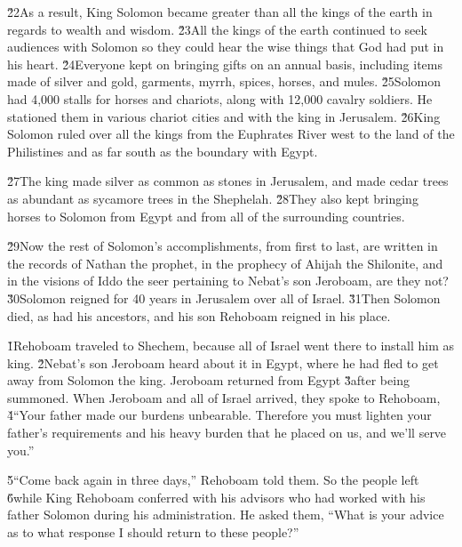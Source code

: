 \v{22}As a result, King Solomon became greater than all the kings of the earth in regards to wealth and wisdom. \v{23}All the kings of the earth continued to seek audiences with Solomon so they could hear the wise things that God had put in his heart. \v{24}Everyone kept on bringing gifts on an annual basis, including items made of silver and gold, garments, myrrh, spices, horses, and mules. \v{25}Solomon had 4,000 stalls for horses and chariots, along with 12,000 cavalry soldiers. He stationed them in various chariot cities and with the king in Jerusalem. \v{26}King Solomon ruled over all the kings from the Euphrates River west to the land of the Philistines and as far south as the boundary with Egypt.

\v{27}The king made silver as common as stones in Jerusalem, and made cedar trees as abundant as sycamore trees in the Shephelah. \v{28}They also kept bringing horses to Solomon from Egypt and from all of the surrounding countries.

\v{29}Now the rest of Solomon's accomplishments, from first to last, are written in the records of Nathan the prophet, in the prophecy of Ahijah the Shilonite, and in the visions of Iddo the seer pertaining to Nebat's son Jeroboam, are they not? \v{30}Solomon reigned for 40 years in Jerusalem over all of Israel. \v{31}Then Solomon died, as had his ancestors, and his son Rehoboam reigned in his place.

\v{1}Rehoboam traveled to Shechem, because all of Israel went there to install him as king. \v{2}Nebat's son Jeroboam heard about it in Egypt, where he had fled to get away from Solomon the king. Jeroboam returned from Egypt \v{3}after being summoned. When Jeroboam and all of Israel arrived, they spoke to Rehoboam, \v{4}``Your father made our burdens unbearable. Therefore you must lighten your father's requirements and his heavy burden that he placed on us, and we'll serve you.''

\v{5}``Come back again in three days,'' Rehoboam told them. So the people left \v{6}while King Rehoboam conferred with his advisors who had worked with his father Solomon during his administration. He asked them, ``What is your advice as to what response I should return to these people?''

